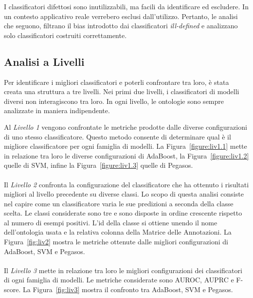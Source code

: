 \documentclass[12pt,a4paper,oneside,hidelinks]{report}
\begin{document}
I classificatori difettosi sono inutilizzabili, ma facili da identificare ed escludere. In un contesto applicativo reale verrebero esclusi dall'utilizzo. Pertanto, le analisi che seguono, filtrano il bias introdotto dai classificatori \emph{ill-defined} e analizzano solo classificatori costruiti correttamente.

\subsection{Analisi a Livelli}
Per identificare i migliori classificatori e poterli confrontare tra loro, è stata creata una struttura a tre livelli. Nei primi due livelli, i classificatori di modelli diversi non interagiscono tra loro. In ogni livello, le ontologie sono sempre analizzate in maniera indipendente. 

Al \textit{Livello 1} vengono confrontate le metriche prodotte dalle diverse configurazioni di uno stesso classificatore. Questo metodo consente di determinare qual è il migliore classificatore per ogni famiglia di modelli. La Figura~\ref{figure:liv1.1} mette in relazione tra loro le diverse configurazioni di AdaBoost, la Figura~\ref{figure:liv1.2} quelle di SVM, infine la Figura~\ref{figure:liv1.3} quelle di Pegasos.

\paragraph*{}
Il \textit{Livello 2} confronta la configurazione del classificatore che ha ottenuto i risultati migliori al livello precedente su diverse classi. Lo scopo di questa analisi consiste nel capire come un classificatore varia le sue predizioni a seconda della classe scelta. Le classi considerate sono tre e sono disposte in ordine crescente rispetto al numero di esempi positivi. L'id della classe si ottiene unendo il nome dell'ontologia usata e la relativa colonna della Matrice delle Annotazioni.
La Figura~\ref{fig:liv2} mostra le metriche ottenute dalle migliori configurazioni di AdaBoost, SVM e Pegasos.

\paragraph*{}
Il \textit{Livello 3} mette in relazione tra loro le migliori configurazioni dei classificatori di ogni famiglia di modelli. Le metriche considerate sono AUROC, AUPRC e F-score. La Figura~\ref{fig:liv3} mostra il confronto tra AdaBoost, SVM e Pegasos.
\end{document}
